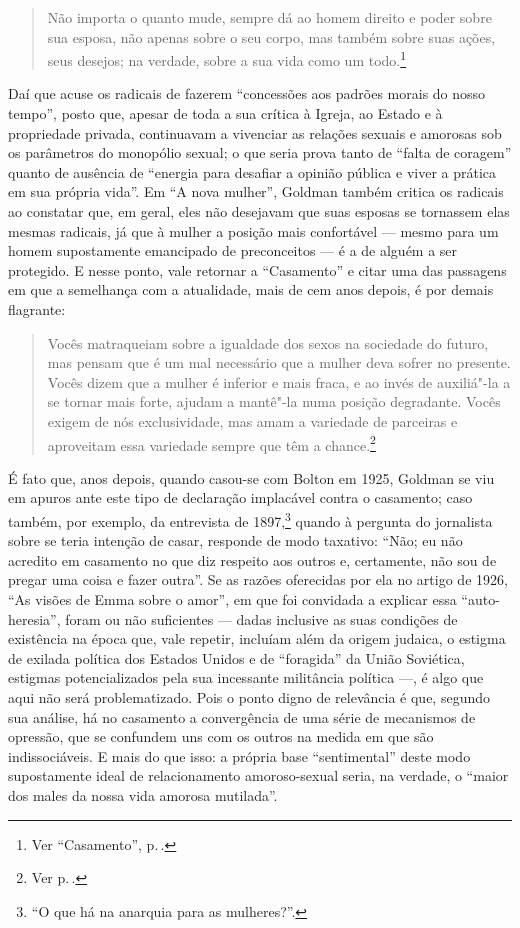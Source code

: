 \begin{quote}
Não importa o quanto mude, sempre dá ao homem direito e poder sobre sua esposa, não apenas sobre o seu corpo, mas também sobre suas ações, seus desejos; na verdade, sobre a
sua vida como um todo.\footnote{Ver ``Casamento'', p.\,\pageref{cruel}.}
\end{quote}

Daí que acuse
os radicais de fazerem ``concessões aos padrões morais do nosso tempo'',
posto que, apesar de toda a sua crítica à Igreja, ao Estado e à
propriedade privada, continuavam a vivenciar as relações sexuais e
amorosas sob os parâmetros do monopólio sexual; o que seria prova tanto
de ``falta de coragem'' quanto de ausência de ``energia para desafiar a
opinião pública e viver a prática em sua própria vida''. Em ``A nova
mulher'', Goldman também critica os radicais ao constatar que, em geral,
eles não desejavam que suas esposas se tornassem elas mesmas radicais,
já que à mulher a posição mais confortável --- mesmo para um homem
supostamente emancipado de preconceitos --- é a de alguém a ser
protegido. E nesse ponto, vale retornar a ``Casamento'' e
citar uma das passagens em que a semelhança com a atualidade, mais de
cem anos depois, é por demais flagrante:

\begin{quote}
Vocês matraqueiam sobre a igualdade dos sexos na sociedade do futuro, mas
pensam que é um mal necessário que a mulher deva sofrer no presente.
Vocês dizem que a mulher é inferior e mais fraca, e ao invés de
auxiliá"-la a se tornar mais forte, ajudam a mantê"-la numa posição
degradante. Vocês exigem de nós exclusividade, mas amam a variedade de
parceiras e aproveitam essa variedade sempre que têm a chance.\footnote{Ver p.\,\pageref{matraqueiam}.}
\end{quote}

É fato que, anos depois, quando casou-se com Bolton em 1925, Goldman
se viu em apuros ante este tipo de declaração implacável contra o
casamento; caso também, por exemplo, da entrevista de 1897,\footnote{``O que há
na anarquia para as mulheres?''.} quando à pergunta do jornalista sobre
se teria intenção de casar, responde de modo taxativo: ``Não; eu não
acredito em casamento no que diz respeito aos outros e, certamente, não
sou de pregar uma coisa e fazer outra''. Se as razões oferecidas por
ela no artigo de 1926, ``As visões de Emma sobre o amor'',
em que foi convidada a explicar essa ``auto-heresia'', foram ou não
suficientes --- dadas inclusive as suas condições de existência na época
que, vale repetir, incluíam além da origem judaica, o estigma de exilada
política dos Estados Unidos e de ``foragida'' da União Soviética,
estigmas potencializados pela sua incessante militância política ---, é
algo que aqui não será problematizado. Pois o ponto
digno de relevância é que, segundo sua análise, há no
casamento a convergência de uma série de mecanismos de opressão, que se
confundem uns com os outros na medida em que são indissociáveis. E mais
do que isso: a própria base ``sentimental'' deste modo supostamente
ideal de relacionamento amoroso-sexual seria, na verdade, o ``maior dos
males da nossa vida amorosa mutilada''.


